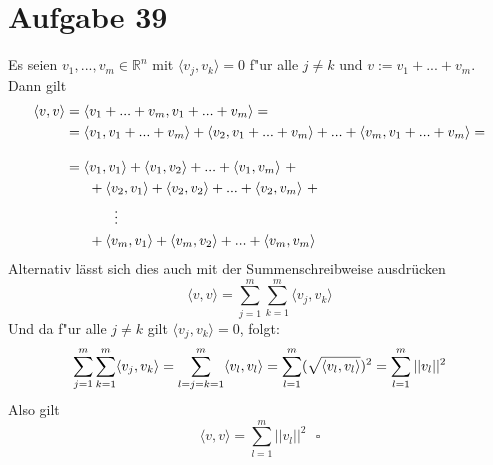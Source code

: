 \section{Aufgabe 39}

Es seien $v_1,...,v_m \in \mathbb{R}^n$ mit $\langle v_j, v_k \rangle = 0$ f"ur
alle $j \neq k$ und $v := v_1 + ... + v_m$. Dann gilt
\begin{align*}
    \langle v, v \rangle &= \langle v_1 + ... + v_m, v_1 + ... + v_m \rangle = \\
                         &= \langle v_1, v_1 + ... + v_m \rangle + \langle v_2, v_1 + ... + v_m \rangle + ... + \langle v_m, v_1 + ... + v_m \rangle = \\[10pt]
                         &=           \langle v_1, v_1 \rangle + \langle v_1, v_2 \rangle + ... + \langle v_1, v_m \rangle \ + \\
                         &\ \ \ \ \ + \langle v_2, v_1 \rangle + \langle v_2, v_2 \rangle + ... + \langle v_2, v_m \rangle \ + \\
                         &\hspace{35px} \vdots \\
                         &\ \ \ \ \ + \langle v_m, v_1 \rangle + \langle v_m, v_2 \rangle + ... + \langle v_m, v_m \rangle
\end{align*}
Alternativ lässt sich dies auch mit der Summenschreibweise ausdrücken
\begin{equation*}
    \langle v, v \rangle = \sum_{j = 1}^m\sum_{k = 1}^m\langle v_j, v_k \rangle
\end{equation*}
Und da f"ur alle $j \neq k$ gilt $\langle v_j, v_k \rangle = 0$, folgt:
\begin{equation*}
    \sum_{j = 1}^m\sum_{k = 1}^m\langle v_j, v_k \rangle = \sum_{l = j = k = 1}^m\langle v_l, v_l \rangle = \sum_{l = 1}^m(\sqrt{\langle v_l, v_l \rangle})^2 = \sum_{l = 1}^m||v_l||^2 \\
\end{equation*}
Also gilt
\begin{equation*}
    \langle v, v \rangle = \sum_{l = 1}^m||v_l||^2 \ \ \ \square
\end{equation*}
